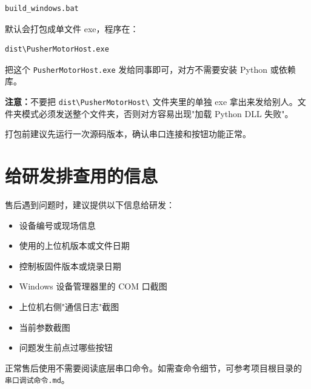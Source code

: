 \begin{lstlisting}[language=bash, caption={打包命令}, label={lst:build}]
build_windows.bat
\end{lstlisting}

默认会打包成单文件 exe，程序在：

\begin{lstlisting}[language=bash, caption={打包输出路径}, label={lst:dist-path}]
dist\PusherMotorHost.exe
\end{lstlisting}

把这个 \texttt{PusherMotorHost.exe} 发给同事即可，对方不需要安装 Python 或依赖库。

\textbf{注意：}不要把 \texttt{dist\textbackslash{}PusherMotorHost\textbackslash{}} 文件夹里的单独 exe 拿出来发给别人。文件夹模式必须发送整个文件夹，否则对方容易出现"加载 Python DLL 失败"。

打包前建议先运行一次源码版本，确认串口连接和按钮功能正常。

\section{给研发排查用的信息}

售后遇到问题时，建议提供以下信息给研发：

\begin{itemize}
    \item 设备编号或现场信息
    \item 使用的上位机版本或文件日期
    \item 控制板固件版本或烧录日期
    \item Windows 设备管理器里的 COM 口截图
    \item 上位机右侧"通信日志"截图
    \item 当前参数截图
    \item 问题发生前点过哪些按钮
\end{itemize}

正常售后使用不需要阅读底层串口命令。如需查命令细节，可参考项目根目录的 \texttt{串口调试命令.md}。
